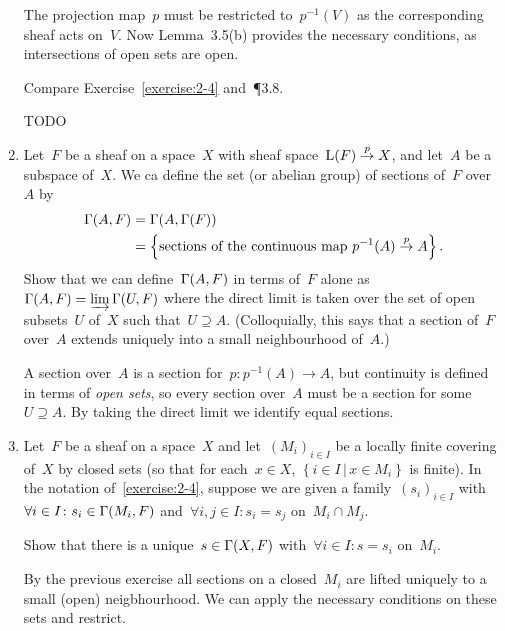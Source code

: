 \documentclass[a4paper,11pt,oneside,openany,article]{memoir}
\begin{document}
\begin{enumerate}
    \begin{solution}
      The projection map~$p$ must be restricted to~$p^{-1}(V)$ as the corresponding sheaf acts on~$V$. Now Lemma~3.5(b) provides the necessary conditions, as intersections of open sets are open.
    \end{solution}

    Compare Exercise~\ref{exercise:2-4} and~\P3.8.

    \begin{solution}
      TODO
    \end{solution}

  \item\label{exercise:2-4} Let~$F$ be a sheaf on a space~$X$ with sheaf space~$\mathrm{L}(F)\overset{p}{\rightarrow} X$, and let~$A$ be a subspace of~$X$. We ca define the set (or abelian group) of sections of~$F$ over~$A$ by
    \begin{align}
      \mathrm{\Gamma}(A,F)&=\mathrm{\Gamma}(A,\mathrm{\Gamma}(F)) \\
      &=\left\{ \text{sections of the continuous map $p^{-1}(A)\overset{p}{\rightarrow}A$} \right\}.
    \end{align}
    Show that we can define~$\mathrm{\Gamma}(A,F)$ in terms of~$F$ alone as~$\mathrm{\Gamma}(A,F)=\varinjlim\mathrm{\Gamma}(U,F)$ where the direct limit is taken over the set of open subsets~$U$ of~$X$ such that~$U\supseteq A$. (Colloquially, this says that a section of~$F$ over~$A$ extends uniquely into a small neighbourhood of~$A$.)

    \begin{solution}
      A section over~$A$ is a section for~$p\colon p^{-1}(A)\to A$, but continuity is defined in terms of \emph{open sets}, so every section over~$A$ must be a section for some~$U\supseteq A$. By taking the direct limit we identify equal sections.
    \end{solution}

  \item\label{exercise:2-5} Let~$F$ be a sheaf on a space~$X$ and let~$(M_i)_{i\in I}$ be a locally finite covering of~$X$ by closed sets (so that for each~$x\in X$, $\left\{ i\in I\,|\,x\in M_i \right\}$ is finite). In the notation of~\ref{exercise:2-4}, suppose we are given a family~$(s_i)_{i\in I}$ with~$\forall i\in I\colon s_i\in\mathrm{\Gamma}(M_i,F)$ and~$\forall i,j\in I\colon s_i=s_j$ on~$M_i\cap M_j$.

    Show that there is a unique~$s\in\mathrm{\Gamma}(X,F)$ with~$\forall i\in I\colon s=s_i$ on~$M_i$.

    \begin{solution}
      By the previous exercise all sections on a closed~$M_i$ are lifted uniquely to a small (open) neigbhourhood. We can apply the necessary conditions on these sets and restrict.
    \end{solution}


\end{enumerate}
\end{document}
